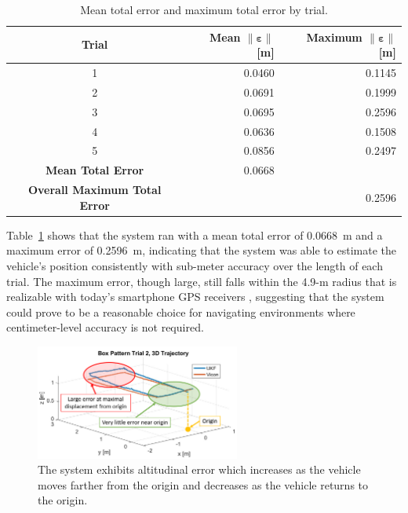 \begin{table}[h]\centering
\caption[Mean Total Error and Maximum Total Error]{Mean total error and maximum total error by trial.}
\begin{tabular}[c]{crr}
\toprule
Trial & Mean $\| \bm{\varepsilon} \|$ [m] & Maximum $\| \bm{\varepsilon} \|$ [m] \\
\hline
1 & 0.0460 & 0.1145 \\
2 & 0.0691 & 0.1999 \\
3 & 0.0695 & 0.2596 \\
4 & 0.0636 & 0.1508 \\
5 & 0.0856 & 0.2497 \\
\hline
\textbf{Mean Total Error} & 0.0668 \\
\hline
\textbf{Overall Maximum Total Error} && 0.2596 \\
\bottomrule
\end{tabular}
\label{tab:total_err}
\end{table}

Table~\ref{tab:total_err} shows that the system ran with a mean total error of 0.0668~m and a maximum error of 0.2596~m, indicating that the system was able to estimate the vehicle's position consistently with sub-meter accuracy over the length of each trial. The maximum error, though large, still falls within the 4.9-m radius that is realizable with today's smartphone GPS receivers \cite{GpsGov}, suggesting that the system could prove to be a reasonable choice for navigating environments where centimeter-level accuracy is not required.

\begin{figure}[h]
  \centering
    \includegraphics[width=0.6\textwidth]{box_error_diagram}
  \caption[Box Pattern Error Behavior]{The system exhibits altitudinal error which increases as the vehicle moves farther from the origin and decreases as the vehicle returns to the origin.}
  \label{fig:box_error_diagram}
\end{figure}

